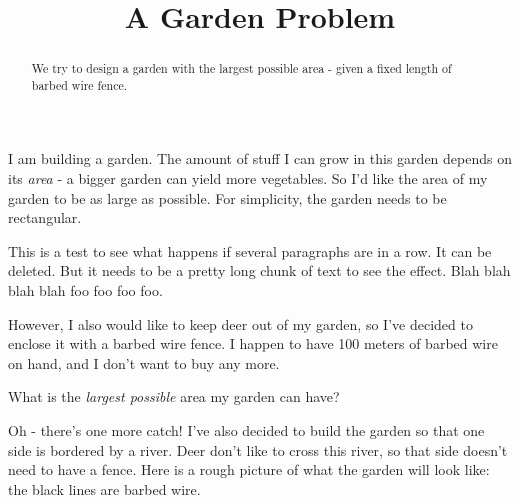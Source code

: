 \documentclass{ximera}
\title{A Garden Problem}
\begin{document}
\begin{abstract}
We try to design a garden with the largest possible area - given a fixed length of barbed wire fence.
\end{abstract}

I am building a garden. The amount of stuff I can grow in this garden depends on its \emph{area} - a bigger garden can yield more vegetables. So I'd like the area of my garden to be as large as possible. For simplicity, the garden needs to be rectangular.

This is a test to see what happens if several paragraphs are in a row. It can be deleted. But it needs to be a pretty long chunk of text to see the effect. Blah blah blah blah foo foo foo foo.

However, I also would like to keep deer out of my garden, so I've decided to enclose it with a barbed wire fence. I happen to have 100 meters of barbed wire on hand, and I don't want to buy any more.

\begin{question}
What is the \emph{largest possible} area my garden can have?
\end{question}

Oh - there's one more catch! I've also decided to build the garden so that one side is bordered by a river. Deer don't like to cross this river, so that side doesn't need to have a fence. Here is a rough picture of what the garden will look like: the black lines are barbed wire.
\end{document}
